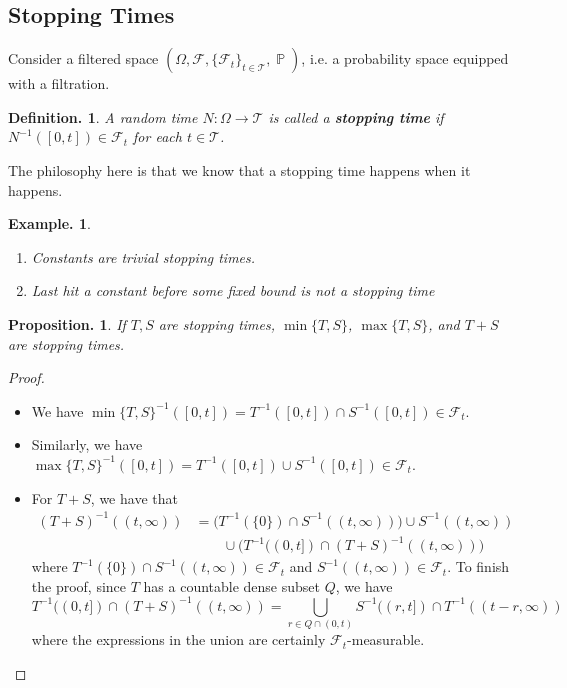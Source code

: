 \documentclass[11pt, a4paper]{memoir}
\newcommand{\agspace}{\ensuremath{\phantom{--}}}
\theoremstyle{change}
\newtheorem{proposition}[theorem]{Proposition.}
\theoremstyle{plain}
\theoremstyle{nonumberplain}
\newtheorem{definition}{Definition.}
\newtheorem{example}{Example.}
\newtheorem{proof}{Proof}
\DeclareMathOperator{\pr}{{\mathbb{P}}}
\newcommand{\defn}[1]{{\boldmath\bfseries #1}}
\numberwithin{equation}{section}
\begin{document}
\subsection{Stopping Times}
Consider a filtered space $(\Omega,\mathcal{F},\{\mathcal{F}_t\}_{t\in \mathcal{T}},\pr)$, i.e. a probability space equipped with a filtration.
\begin{definition}
    A random time $N:\Omega\to \mathcal{T}$ is called a \defn{stopping time} if $N^{-1}([0,t])\in\mathcal{F}_t$ for each $t\in \mathcal{T}$.
\end{definition}
The philosophy here is that we know that a stopping time happens when it happens.
\begin{example}
    \begin{enumerate}[nl,r]
        \item Constants are trivial stopping times.
        \item Last hit a constant before some fixed bound is not a stopping time
    \end{enumerate}
\end{example}
\begin{proposition}
    If $T,S$ are stopping times, $\min\{T,S\}$, $\max\{T,S\}$, and $T+S$ are stopping times.
\end{proposition}
\begin{proof}
    \begin{itemize}[nl]
        \item We have $\min\{T,S\}^{-1}([0,t])=T^{-1}([0,t])\cap S^{-1}([0,t])\in\mathcal{F}_t$.
        \item Similarly, we have $\max\{T,S\}^{-1}([0,t])=T^{-1}([0,t])\cup S^{-1}([0,t])\in\mathcal{F}_t$.
        \item For $T+S$, we have that
            \begin{align*}
                (T+S)^{-1}((t,\infty))&=\bigl(T^{-1}(\{0\})\cap S^{-1}((t,\infty))\bigr)\cup S^{-1}((t,\infty))\\
                                      &\agspace \cup\bigl(T^{-1}((0,t])\cap (T+S)^{-1}((t,\infty))\bigr)
            \end{align*}
            where $T^{-1}(\{0\})\cap S^{-1}((t,\infty))\in\mathcal{F}_t$ and $S^{-1}((t,\infty))\in\mathcal{F}_t$.
            To finish the proof, since $T$ has a countable dense subset $Q$, we have
            \begin{equation*}
                T^{-1}((0,t])\cap (T+S)^{-1}((t,\infty))=\bigcup_{r\in Q\cap(0,t)}S^{-1}((r,t])\cap T^{-1}((t-r,\infty))
            \end{equation*}
            where the expressions in the union are certainly $\mathcal{F}_t$-measurable.
    \end{itemize}
\end{proof}
\end{document}
